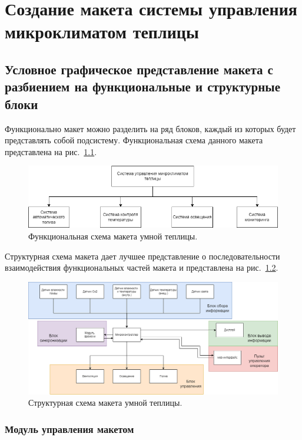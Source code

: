 \chapter{Создание макета системы управления микроклиматом теплицы}

\section{Условное графическое представление макета с разбиением на функциональные и структурные блоки}

Функционально макет можно разделить на ряд блоков, каждый из которых будет представлять собой подсистему. Функциональная схема данного макета представлена на рис.~\ref{fig:func_schem}.

\begin{figure}[H]
    \centering
    \includegraphics[scale=0.6]{images/system_schem.png}
    \caption{Функциональная схема макета умной теплицы.}
    \label{fig:func_schem}
\end{figure}

Структурная схема макета дает лучшее представление о последовательности взаимодействия функциональных частей макета и представлена на рис.~\ref{fig:struct_schem}.

\begin{figure}[H]
    \centering
    \includegraphics[scale=0.4]{images/struct_schem.png}
    \caption{Структурная схема макета умной теплицы.}
    \label{fig:struct_schem}
\end{figure}

\subsection{Модуль управления макетом}


